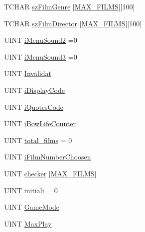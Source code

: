 \begin{DoxyCompactItemize}
T\+C\+H\+A\+R \hyperlink{_b_o_w-a_01film_01guessing_01game_8cpp_a01a6533181bdfc23246ee27b81676dd4}{sz\+Film\+Genre} \mbox{[}\hyperlink{_b_o_w-a_01film_01guessing_01game_8cpp_aa31048f49d109f6551271267f3470d11}{M\+A\+X\+\_\+\+F\+I\+L\+M\+S}\mbox{]}\mbox{[}100\mbox{]}
\item 
T\+C\+H\+A\+R \hyperlink{_b_o_w-a_01film_01guessing_01game_8cpp_abf59bae7e5868bcd8abffb3efd1c20e4}{sz\+Film\+Director} \mbox{[}\hyperlink{_b_o_w-a_01film_01guessing_01game_8cpp_aa31048f49d109f6551271267f3470d11}{M\+A\+X\+\_\+\+F\+I\+L\+M\+S}\mbox{]}\mbox{[}100\mbox{]}
\item 
U\+I\+N\+T \hyperlink{_b_o_w-a_01film_01guessing_01game_8cpp_adabd6149d4ae0439f2cca30177746b0c}{i\+Menu\+Sound2} =0
\item 
U\+I\+N\+T \hyperlink{_b_o_w-a_01film_01guessing_01game_8cpp_aa0a3891a9b50affabc7596c660bb26a9}{i\+Menu\+Sound3} =0
\item 
U\+I\+N\+T \hyperlink{_b_o_w-a_01film_01guessing_01game_8cpp_a82d7703b8813bfd2a29818c91e75b100}{Invalidat}
\item 
U\+I\+N\+T \hyperlink{_b_o_w-a_01film_01guessing_01game_8cpp_a5648a01db7fef763491b4201c024c633}{i\+Display\+Code}
\item 
U\+I\+N\+T \hyperlink{_b_o_w-a_01film_01guessing_01game_8cpp_a73cf9225cccfb40d7c795a7edaa0887a}{i\+Quotes\+Code}
\item 
U\+I\+N\+T \hyperlink{_b_o_w-a_01film_01guessing_01game_8cpp_a367defee513037600b01dd575f342e51}{i\+Bow\+Life\+Counter}
\item 
U\+I\+N\+T \hyperlink{_b_o_w-a_01film_01guessing_01game_8cpp_acaa93e2bd2a424cfc45e2a7c95a74d95}{total\+\_\+films} = 0
\item 
U\+I\+N\+T \hyperlink{_b_o_w-a_01film_01guessing_01game_8cpp_ab0a07588b9b285d7bbf9a93552a9309e}{i\+Film\+Number\+Choosen}
\item 
U\+I\+N\+T \hyperlink{_b_o_w-a_01film_01guessing_01game_8cpp_a14e016f5b05bf5b31b6a5e34ebf14ddf}{checker} \mbox{[}\hyperlink{_b_o_w-a_01film_01guessing_01game_8cpp_aa31048f49d109f6551271267f3470d11}{M\+A\+X\+\_\+\+F\+I\+L\+M\+S}\mbox{]}
\item 
U\+I\+N\+T \hyperlink{_b_o_w-a_01film_01guessing_01game_8cpp_af1c05f398b0659e822fd85b72d4915be}{initiali} = 0
\item 
U\+I\+N\+T \hyperlink{_b_o_w-a_01film_01guessing_01game_8cpp_a30496839d082019937429867d2a7187b}{Game\+Mode}
\item 
U\+I\+N\+T \hyperlink{_b_o_w-a_01film_01guessing_01game_8cpp_a3aad5b2acd91d72c754f0b79d8b13d16}{Max\+Play}

\end{DoxyCompactItemize}

